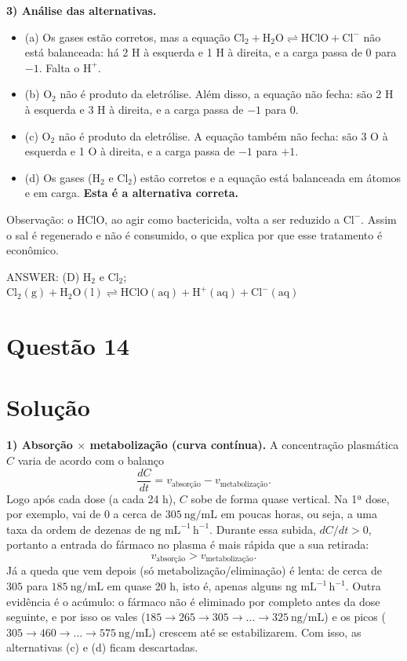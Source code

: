 \documentclass{article}%
\begin{document}
\textbf{3) Análise das alternativas.}
\begin{itemize}
\item (a) Os gases estão corretos, mas a equação $\mathrm{Cl_2 + H_2O \rightleftharpoons HClO + Cl^-}$ não está balanceada: há 2 H à esquerda e 1 H à direita, e a carga passa de $0$ para $-1$. Falta o $\mathrm{H^+}$.
\item (b) $\mathrm{O_2}$ não é produto da eletrólise. Além disso, a equação não fecha: são 2 H à esquerda e 3 H à direita, e a carga passa de $-1$ para $0$.
\item (c) $\mathrm{O_2}$ não é produto da eletrólise. A equação também não fecha: são 3 O à esquerda e 1 O à direita, e a carga passa de $-1$ para $+1$.
\item (d) Os gases ($\mathrm{H_2}$ e $\mathrm{Cl_2}$) estão corretos e a equação está balanceada em átomos e em carga. \textbf{Esta é a alternativa correta.}
\end{itemize}

Observação: o $\mathrm{HClO}$, ao agir como bactericida, volta a ser reduzido a $\mathrm{Cl^-}$. Assim o sal é regenerado e não é consumido, o que explica por que esse tratamento é econômico.

ANSWER: (D) $\mathrm{H_2}$ e $\mathrm{Cl_2}$; $\mathrm{Cl_2(g) + H_2O(l) \rightleftharpoons HClO(aq) + H^+(aq) + Cl^-(aq)}$%
\newpage%
\section*{Questão 14}

\section*{Solução}

\textbf{1) Absorção $\times$ metabolização (curva contínua).}
A concentração plasmática $C$ varia de acordo com o balanço
\[
\frac{dC}{dt} = v_{\text{absorção}} - v_{\text{metabolização}} .
\]
Logo após cada dose (a cada 24 h), $C$ sobe de forma quase vertical. Na 1ª dose, por exemplo, vai de $0$ a cerca de $305\ \text{ng/mL}$ em poucas horas, ou seja, a uma taxa da ordem de dezenas de $\text{ng mL}^{-1}\,\text{h}^{-1}$. Durante essa subida, $dC/dt>0$, portanto a entrada do fármaco no plasma é mais rápida que a sua retirada:
\[
v_{\text{absorção}} > v_{\text{metabolização}} .
\]
Já a queda que vem depois (só metabolização/eliminação) é lenta: de cerca de $305$ para $185\ \text{ng/mL}$ em quase 20 h, isto é, apenas alguns $\text{ng mL}^{-1}\,\text{h}^{-1}$. Outra evidência é o acúmulo: o fármaco não é eliminado por completo antes da dose seguinte, e por isso os vales ($185 \to 265 \to 305 \to \dots \to 325\ \text{ng/mL}$) e os picos ($305 \to 460 \to \dots \to 575\ \text{ng/mL}$) crescem até se estabilizarem. Com isso, as alternativas (c) e (d) ficam descartadas.
\end{document}
